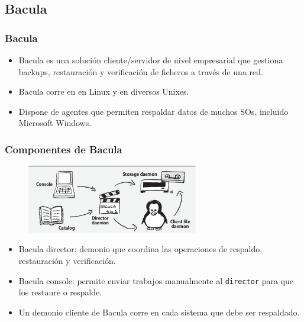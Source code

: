 \documentclass{beamer}
\begin{document}
\subsection{Bacula}

\begin{frame}
  \frametitle{Bacula}
  \begin{itemize}
    \item Bacula es una solución cliente/servidor de nivel empresarial que gestiona backups, restauración y verificación de ficheros a través de una red.
    \item Bacula corre en en Linux y en diversos Unixes.
    \item Dispone de agentes que permiten respaldar datos de muchos SOs, incluido Microsoft Windows.
  \end{itemize}
\end{frame}


\begin{frame}
  \frametitle{Componentes de Bacula}

\begin{figure}[h]
\begin{center}
  \includegraphics[width=7.5cm]{figs/bacula.png}
\end{center}
\end{figure}

  \begin{itemize}

    \item \alert{Bacula director}: demonio que coordina las operaciones de respaldo, restauración y verificación.
    \item \alert{Bacula console}: permite enviar trabajos manualmente al \texttt{director} para que los restaure o respalde. 
    \item Un \alert{demonio cliente de Bacula} corre en cada sistema que debe ser respaldado.
  \end{itemize}

\end{frame}




\end{document}
